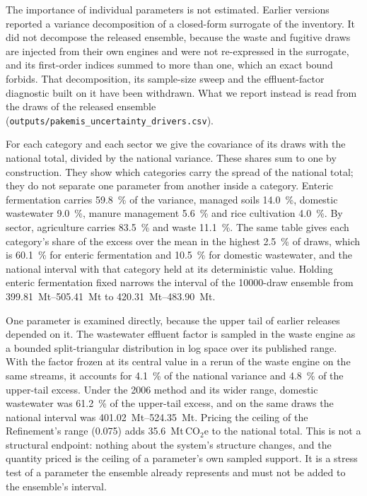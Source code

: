 \documentclass[essd]{copernicus}
\begin{document}
The importance of individual parameters is not estimated. Earlier versions reported a variance decomposition of a closed-form surrogate of the inventory. It did not decompose the released ensemble, because the waste and fugitive draws are injected from their own engines and were not re-expressed in the surrogate, and its first-order indices summed to more than one, which an exact bound forbids. That decomposition, its sample-size sweep and the effluent-factor diagnostic built on it have been withdrawn. What we report instead is read from the draws of the released ensemble (\texttt{outputs/pakemis\_uncertainty\_drivers.csv}).

For each category and each sector we give the covariance of its draws with the national total, divided by the national variance. These shares sum to one by construction. They show which categories carry the spread of the national total; they do not separate one parameter from another inside a category. Enteric fermentation carries \SI{59.8}{\percent} of the variance, managed soils \SI{14.0}{\percent}, domestic wastewater \SI{9.0}{\percent}, manure management \SI{5.6}{\percent} and rice cultivation \SI{4.0}{\percent}. By sector, agriculture carries \SI{83.5}{\percent} and waste \SI{11.1}{\percent}. The same table gives each category's share of the excess over the mean in the highest \SI{2.5}{\percent} of draws, which is \SI{60.1}{\percent} for enteric fermentation and \SI{10.5}{\percent} for domestic wastewater, and the national interval with that category held at its deterministic value. Holding enteric fermentation fixed narrows the interval of the \num{10000}-draw ensemble from \SIrange{399.81}{505.41}{\mega\tonne} to \SIrange{420.31}{483.90}{\mega\tonne}.

One parameter is examined directly, because the upper tail of earlier releases depended on it. The wastewater effluent factor is sampled in the waste engine as a bounded split-triangular distribution in log space over its published range. With the factor frozen at its central value in a rerun of the waste engine on the same streams, it accounts for \SI{4.1}{\percent} of the national variance and \SI{4.8}{\percent} of the upper-tail excess. Under the 2006 method and its wider range, domestic wastewater was \SI{61.2}{\percent} of the upper-tail excess, and on the same draws the national interval was \SIrange{401.02}{524.35}{\mega\tonne}. Pricing the ceiling of the Refinement's range (\num{0.075}) adds \SI{35.6}{\mega\tonne}\,CO$_2$e to the national total. This is not a structural endpoint: nothing about the system's structure changes, and the quantity priced is the ceiling of a parameter's own sampled support. It is a stress test of a parameter the ensemble already represents and must not be added to the ensemble's interval.
\end{document}
